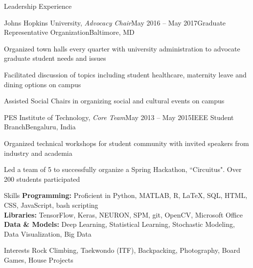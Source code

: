 \documentclass{resume}
\begin{document}
  \begin{rSection}{Leadership Experience}
          \begin{rSubsection}{Johns Hopkins University, \textit{Advocacy Chair}}{May 2016 -- May 2017}{Graduate Representative Organization}{Baltimore, MD}
\item Organized town halls every quarter with university administration to advocate graduate student needs and issues
\item Facilitated discussion of topics including student healthcare, maternity leave and dining options on campus
\item Assisted Social Chairs in organizing social and cultural events on campus
    \end{rSubsection}

\begin{rSubsection}{PES Institute of Technology, \textit{Core Team}}{May 2013 -- May 2015}{IEEE Student Branch}{Bengaluru, India}
\item Organized technical workshops for student community with invited speakers from industry and academia
\item Led a team of 5 to successfully organize a Spring Hackathon, ``Circuitus". Over 200 students participated
    \end{rSubsection}
  \end{rSection}   

\vspace{1em}

    \begin{rSection}{Skills}
\textbf{Programming:} Proficient in Python, MATLAB, R, \LaTeX, SQL, HTML, CSS, JavaScript, bash scripting \\
\textbf{Libraries:} TensorFlow, Keras, NEURON, SPM, git, OpenCV, Microsoft Office \\
\textbf{Data \& Models:} Deep Learning, Statistical Learning, Stochastic Modeling, Data Visualization, Big Data \\
\end{rSection} 

\begin{rSection}{Interests}
Rock Climbing, Taekwondo (ITF), Backpacking, Photography, Board Games, House Projects
\end{rSection} 
\end{document}
